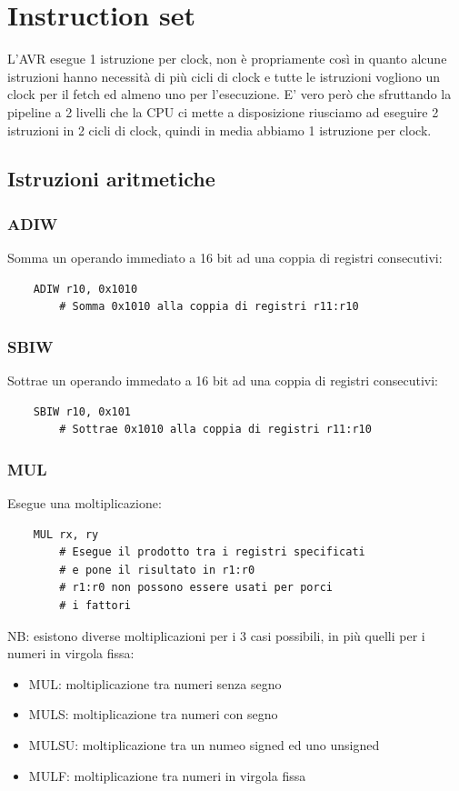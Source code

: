 \section{Instruction set}
L'AVR esegue 1 istruzione per clock, non è propriamente così in quanto alcune istruzioni hanno necessità di più cicli di clock e tutte le istruzioni vogliono un clock per il fetch ed almeno uno per l'esecuzione.
E' vero però che sfruttando la pipeline a 2 livelli che la CPU ci mette a disposizione riusciamo ad eseguire 2 istruzioni in 2 cicli di clock, quindi in media abbiamo 1 istruzione per clock.

\subsection{Istruzioni aritmetiche}

\subsubsection{ADIW}
Somma un operando immediato a 16 bit ad una coppia di registri consecutivi:
\begin{verbatim}
    ADIW r10, 0x1010
        # Somma 0x1010 alla coppia di registri r11:r10
\end{verbatim}

\subsubsection{SBIW}
Sottrae un operando immedato a 16 bit ad una coppia di registri consecutivi:
\begin{verbatim}
    SBIW r10, 0x101
        # Sottrae 0x1010 alla coppia di registri r11:r10
\end{verbatim}

\subsubsection{MUL}
Esegue una moltiplicazione:
\begin{verbatim}
    MUL rx, ry
        # Esegue il prodotto tra i registri specificati
        # e pone il risultato in r1:r0
        # r1:r0 non possono essere usati per porci
        # i fattori
\end{verbatim}

NB: esistono diverse moltiplicazioni per i 3 casi possibili, in più quelli per i numeri in virgola fissa:
\begin{itemize}
    \item MUL: moltiplicazione tra numeri senza segno
    \item MULS: moltiplicazione tra numeri con segno
    \item MULSU: moltiplicazione tra un numeo signed ed uno unsigned
    
    \item MULF: moltiplicazione tra numeri in virgola fissa
\end{itemize}


